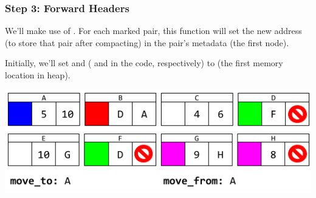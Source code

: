 \subsubsection{Step 3: Forward Headers}
\begin{mdframed}
    We'll make use of . For each marked pair, this function will set the new address (to store that pair after compacting) in the pair's metadata (the first node).
\end{mdframed}

Initially, we'll set  and  ( and  in the code, respectively) to  (the first memory location in heap).

\begin{center}
    \includegraphics[scale=0.6]{assets/GCAlg3.png}
\end{center}

